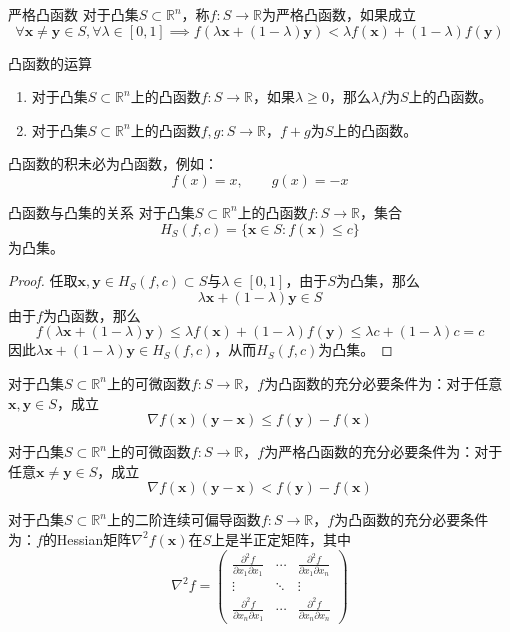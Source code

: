 \documentclass[lang = cn, scheme = chinese, thmcnt = section]{elegantbook}
\newcommand{\R}{\mathbb{R}}            %
\newcommand{\sub}{\subset}             %
\newcommand{\bs}{\boldsymbol}          %
\begin{document}
\begin{definition}{严格凸函数}
	对于凸集$S\sub\R^n$，称$f:S\to\R$为严格凸函数，如果成立
	$$
	\forall \bs{x}\ne\bs{y}\in S,\forall \lambda\in[0,1]\implies
	f(\lambda\bs{x}+(1-\lambda)\bs{y})
	<\lambda f(\bs{x})+(1-\lambda)f(\bs{y})
	$$
\end{definition}

\begin{theorem}{凸函数的运算}
	\begin{enumerate}
		\item 对于凸集$S\sub\R^n$上的凸函数$f:S\to\R$，如果$\lambda\ge 0$，那么$\lambda f$为$S$上的凸函数。
		\item 对于凸集$S\sub\R^n$上的凸函数$f,g:S\to\R$，$f+g$为$S$上的凸函数。
	\end{enumerate}
\end{theorem}

\begin{note}
	凸函数的积未必为凸函数，例如：
	$$
	f(x)=x,\qquad g(x)=-x
	$$
\end{note}

\begin{theorem}{}{凸函数与凸集的关系}
	对于凸集$S\sub\R^n$上的凸函数$f:S\to\R$，集合
	$$
	H_S(f,c)=\{ \bs{x}\in S:f(\bs{x})\le c \}
	$$
	为凸集。
\end{theorem}

\begin{proof}
	任取$\bs{x},\bs{y}\in H_S(f,c)\sub S$与$\lambda\in [0,1]$，由于$S$为凸集，那么
	$$
	\lambda\bs{x}+(1-\lambda)\bs{y}\in S
	$$
	由于$f$为凸函数，那么
	$$
	f(\lambda\bs{x}+(1-\lambda)\bs{y})
	\le\lambda f(\bs{x})+(1-\lambda)f(\bs{y})
	\le \lambda c+(1-\lambda)c=c
	$$
	因此$\lambda\bs{x}+(1-\lambda)\bs{y}\in H_S(f,c)$，从而$H_S(f,c)$为凸集。
\end{proof}

\begin{theorem}
	对于凸集$S\sub\R^n$上的可微函数$f:S\to\R$，$f$为凸函数的充分必要条件为：对于任意$\bs{x},\bs{y}\in S$，成立
	$$
	\nabla f(\bs{x})(\bs{y}-\bs{x})\le f(\bs{y})-f(\bs{x})
	$$
\end{theorem}

\begin{theorem}
	对于凸集$S\sub\R^n$上的可微函数$f:S\to\R$，$f$为严格凸函数的充分必要条件为：对于任意$\bs{x}\ne \bs{y}\in S$，成立
	$$
	\nabla f(\bs{x})(\bs{y}-\bs{x})< f(\bs{y})-f(\bs{x})
	$$
\end{theorem}

\begin{theorem}
	对于凸集$S\sub\R^n$上的二阶连续可偏导函数$f:S\to\R$，$f$为凸函数的充分必要条件为：$f$的Hessian矩阵$\nabla^2 f(\bs{x})$在$S$上是半正定矩阵，其中
	$$
	\nabla^2 f=\begin{pmatrix}
		\frac{\partial^2 f}{\partial x_1\partial x_1} & \cdots & \frac{\partial^2 f}{\partial x_1\partial x_n}\\
		\vdots & \ddots & \vdots \\
		\frac{\partial^2 f}{\partial x_n\partial x_1} & \cdots & \frac{\partial^2 f}{\partial x_n\partial x_n}
	\end{pmatrix}
	$$
\end{theorem}
\end{document}
